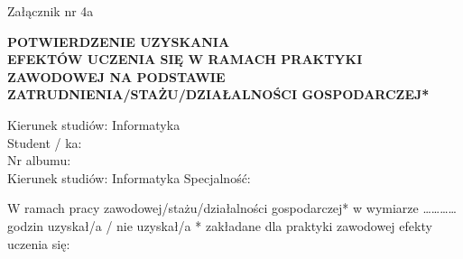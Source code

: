 \documentclass[11pt,a4paper]{article}
\begin{document}
\begin{flushright}
Załącznik nr 4a
\end{flushright}

\vspace{-1em}
\begin{center}
\textbf{\large POTWIERDZENIE UZYSKANIA} \\[0.5em]
\textbf{\large EFEKTÓW UCZENIA SIĘ W RAMACH PRAKTYKI ZAWODOWEJ NA PODSTAWIE ZATRUDNIENIA/STAŻU/DZIAŁALNOŚCI GOSPODARCZEJ*}
\end{center}

\vspace{1em}

\noindent Kierunek studiów: Informatyka \\
Student / ka: \dotfill \\
Nr albumu: \dotfill \\
Kierunek studiów: Informatyka \hfill Specjalność: \dotfill \\
\dotfill

\vspace{1em}
\noindent W ramach pracy zawodowej/stażu/działalności gospodarczej* w wymiarze \dots\dots\dots\dots godzin uzyskał/a / nie uzyskał/a * zakładane dla praktyki zawodowej efekty uczenia się:

\vspace{1em}
\end{document}
